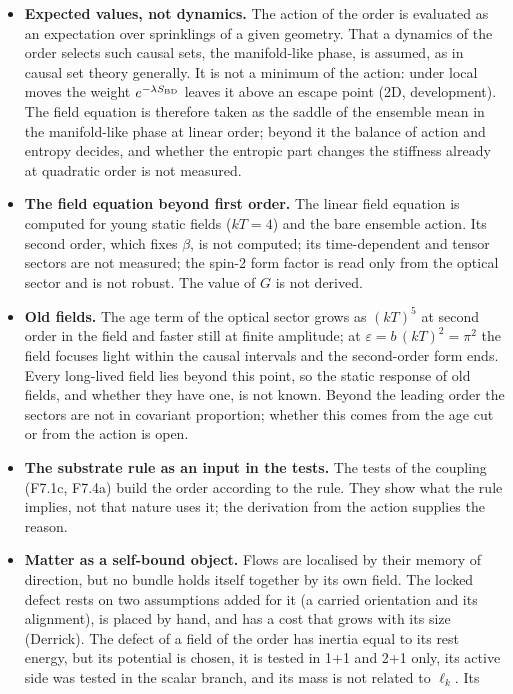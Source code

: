 \begin{itemize}
\item \textbf{Expected values, not dynamics.} The action of the order is evaluated as an expectation over
  sprinklings of a given geometry. That a dynamics of the order selects such causal sets, the manifold-like
  phase, is assumed, as in causal set theory generally. It is not a minimum of the action: under local moves the
  weight $e^{-\lambda S_{\mathrm{BD}}}$ leaves it above an escape point (2D, development). The field equation is therefore
  taken as the saddle of the ensemble mean in the manifold-like phase at linear order; beyond it the balance of
  action and entropy decides, and whether the entropic part changes the stiffness already at quadratic order is
  not measured.
\item \textbf{The field equation beyond first order.} The linear field equation is computed for young static
  fields ($kT=4$) and the bare ensemble action. Its second order, which fixes $\beta$, is not computed; its
  time-dependent and tensor sectors are not measured; the spin-2 form factor is read only from the optical sector
  and is not robust. The value of $G$ is not derived.
\item \textbf{Old fields.} The age term of the optical sector grows as $(kT)^5$ at second order in the field and
  faster still at finite amplitude; at $\varepsilon=b\,(kT)^2=\pi^2$ the field focuses light within the causal
  intervals and the second-order form ends. Every long-lived field lies beyond this point, so the static
  response of old fields, and whether they have one, is not known. Beyond the leading order the sectors are not
  in covariant proportion; whether this comes from the age cut or from the action is open.
\item \textbf{The substrate rule as an input in the tests.} The tests of the coupling (F7.1c, F7.4a) build
  the order according to the rule. They show what the rule implies, not that nature uses it; the
  derivation from the action supplies the reason.
\item \textbf{Matter as a self-bound object.} Flows are localised by their memory of direction, but no bundle
  holds itself together by its own field. The locked defect rests on two assumptions added for it (a carried
  orientation and its alignment), is placed by hand, and has a cost that grows with its size (Derrick). The defect
  of a field of the order has inertia equal to its rest energy, but its potential is chosen, it is tested in 1+1
  and 2+1 only, its active side was tested in the scalar branch, and its mass is not related to $\ell_k$. Its

\end{itemize}
